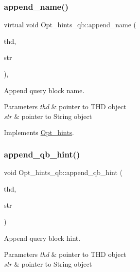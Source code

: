 \subsubsection{\texorpdfstring{append\+\_\+name()}{append\_name()}}
{\footnotesize\ttfamily virtual void Opt\+\_\+hints\+\_\+qb\+::append\+\_\+name (\begin{DoxyParamCaption}\item[{T\+HD $\ast$}]{thd,  }\item[{String $\ast$}]{str }\end{DoxyParamCaption})\hspace{0.3cm}{\ttfamily [inline]}, {\ttfamily [virtual]}}

Append query block name.


\begin{DoxyParams}{Parameters}
{\em thd} & pointer to T\+HD object \\
\hline
{\em str} & pointer to String object \\
\hline
\end{DoxyParams}


Implements \mbox{\hyperlink{classOpt__hints}{Opt\+\_\+hints}}.

\mbox{\label{classOpt__hints__qb_a8399caf3fc8957c96122049e1343dfa2}} 
\subsubsection{\texorpdfstring{append\+\_\+qb\+\_\+hint()}{append\_qb\_hint()}}
{\footnotesize\ttfamily void Opt\+\_\+hints\+\_\+qb\+::append\+\_\+qb\+\_\+hint (\begin{DoxyParamCaption}\item[{T\+HD $\ast$}]{thd,  }\item[{String $\ast$}]{str }\end{DoxyParamCaption})\hspace{0.3cm}{\ttfamily [inline]}}

Append query block hint.


\begin{DoxyParams}{Parameters}
{\em thd} & pointer to T\+HD object \\
\hline
{\em str} & pointer to String object \\
\hline
\end{DoxyParams}
\mbox{\label{classOpt__hints__qb_a6312e36d56b68d1c8622482d39dc580b}} 
